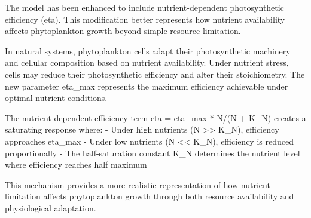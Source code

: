 The model has been enhanced to include nutrient-dependent photosynthetic efficiency (eta). This modification better represents how nutrient availability affects phytoplankton growth beyond simple resource limitation.

In natural systems, phytoplankton cells adapt their photosynthetic machinery and cellular composition based on nutrient availability. Under nutrient stress, cells may reduce their photosynthetic efficiency and alter their stoichiometry. The new parameter eta_max represents the maximum efficiency achievable under optimal nutrient conditions.

The nutrient-dependent efficiency term eta = eta_max * N/(N + K_N) creates a saturating response where:
- Under high nutrients (N >> K_N), efficiency approaches eta_max
- Under low nutrients (N << K_N), efficiency is reduced proportionally
- The half-saturation constant K_N determines the nutrient level where efficiency reaches half maximum

This mechanism provides a more realistic representation of how nutrient limitation affects phytoplankton growth through both resource availability and physiological adaptation.
